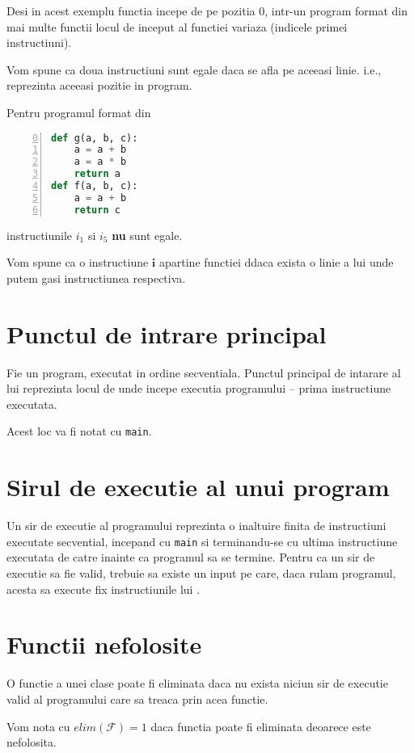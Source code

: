 Desi in acest exemplu functia  incepe de pe pozitia 0,
intr-un program format din mai multe functii locul de inceput al
functiei variaza (indicele primei instructiuni).

Vom spune ca doua instructiuni sunt egale daca se afla pe aceeasi
linie. i.e., reprezinta aceeasi pozitie in program.

Pentru programul format din
\begin{lstlisting}[language=Python, numbers=left, firstnumber=0]
def g(a, b, c):
    a = a + b
    a = a * b
    return a
def f(a, b, c):
    a = a + b
    return c
\end{lstlisting}
instructiunile $i_1$ si $i_5$ \textbf{nu} sunt egale.

Vom spune ca o instructiune $\mathbf{i}$ apartine functiei
 ddaca exista o linie a lui  unde putem gasi
instructiunea respectiva.

\section{Punctul de intrare principal}

Fie  un program, executat in ordine secventiala.
Punctul principal de intarare al lui  reprezinta locul de
unde incepe executia programului -- prima instructiune executata.

Acest loc va fi notat cu \texttt{main}.

\section{Sirul de executie al unui program}

Un sir de executie  al programului  reprezinta o inaltuire
finita de instructiuni executate secvential, incepand cu
\texttt{main} si terminandu-se cu ultima instructiune executata de
catre  inainte ca programul sa se termine.
Pentru ca un sir de executie  sa fie valid, trebuie sa
existe un input pe care, daca rulam programul, acesta sa
execute fix instructiunile lui .

\section{Functii nefolosite}

O functie a unei clase poate fi eliminata daca nu exista niciun
sir de executie valid al programului care sa treaca prin acea
functie.

Vom nota cu $elim(\mathcal{F}) = 1$ daca functia  poate fi
eliminata deoarece este nefolosita.

